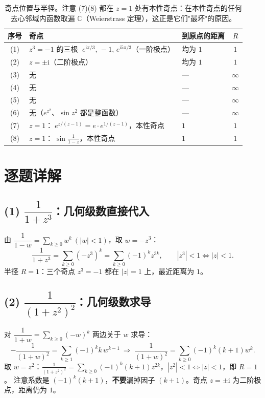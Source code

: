 \documentclass[11pt,a4paper]{ctexart}
\theoremstyle{definition}
\newcommand{\ii}{\mathrm{i}}
\begin{document}
\begin{table}[H]
\centering
\small
\setlength{\tabcolsep}{5pt}
\renewcommand{\arraystretch}{1.25}
\begin{tabular}{@{}c >{\raggedright\arraybackslash}p{6.4cm} >{\raggedright\arraybackslash}p{4.6cm} c@{}}
\toprule
\textbf{序号} & \textbf{奇点} & \textbf{到原点的距离} & \boldmath$R$\\
\midrule
(1) & $z^3=-1$ 的三根 $\;e^{\ii\pi/3},\,-1,\,e^{\ii5\pi/3}$（一阶极点） & 均为 $1$ & $1$\\
(2) & $z=\pm\ii$（二阶极点） & 均为 $1$ & $1$\\
(3) & 无 & --- & $\infty$\\
(4) & 无 & --- & $\infty$\\
(5) & 无 & --- & $\infty$\\
(6) & 无（$e^{z^2}$、$\sin z^2$ 都是整函数） & --- & $\infty$\\
(7) & $z=1$：$\;e^{z/(z-1)}=e\cdot e^{1/(z-1)}$，本性奇点 & $1$ & $1$\\
(8) & $z=1$：$\;\sin\frac1{1-z}$，本性奇点 & $1$ & $1$\\
\bottomrule
\end{tabular}
\caption{奇点位置与半径。注意 (7)(8) 都在 $z=1$ 处有本性奇点：在本性奇点的任何去心邻域内函数取遍 $\mathbb{C}$（Weierstrass 定理），这正是它们"最坏"的原因。}
\end{table}

\section{逐题详解}

\subsection{(1) $\dfrac{1}{1+z^3}$：几何级数直接代入}
由 $\dfrac{1}{1-w}=\sum_{k\ge0}w^k\ (|w|<1)$，取 $w=-z^3$：
\[
\frac{1}{1+z^3}=\sum_{k\ge0}(-z^3)^k=\sum_{k\ge0}(-1)^kz^{3k},\qquad |z^3|<1\iff|z|<1 .
\]
半径 $R=1$：三个奇点 $z^3=-1$ 都在 $|z|=1$ 上，最近距离为 $1$。

\subsection{(2) $\dfrac{1}{(1+z^2)^2}$：几何级数求导}
对 $\dfrac{1}{1+w}=\sum_{k\ge0}(-w)^k$ 两边关于 $w$ 求导：
\[
-\frac{1}{(1+w)^2}=\sum_{k\ge1}(-1)^kk\,w^{k-1}
\ \Longrightarrow\
\frac{1}{(1+w)^2}=\sum_{k\ge0}(-1)^k(k+1)w^{k}.
\]
取 $w=z^2$：$\displaystyle\frac{1}{(1+z^2)^2}=\sum_{k\ge0}(-1)^k(k+1)z^{2k}$，$|z^2|<1\iff|z|<1$，即 $R=1$。
注意系数是 $(-1)^k(k+1)$，\textbf{不要}漏掉因子 $(k+1)$。奇点 $z=\pm\ii$ 为二阶极点，距离仍为 $1$。
\end{document}
